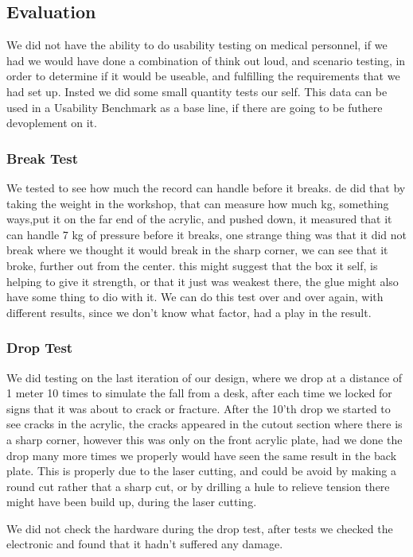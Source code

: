 \subsection{Evaluation}
We did not have the ability to do usability testing on medical personnel, if we had we would have done a combination of think out loud, and scenario testing, in order to determine if it would be useable, and fulfilling the requirements that we had set up.
Insted we did some small quantity tests our self.
This data can be used in a Usability Benchmark as a base line, if there are going to be futhere devoplement on it.

\subsubsection{Break Test}
We tested to see how much the record can handle before it breaks.
de did that by taking the weight in the workshop, that can measure how much kg, something ways,put it on the far end of the acrylic, and pushed down, it measured that it can handle 7 kg of pressure before it breaks, one strange thing was that it did not break where we thought it would break in the sharp corner, we can see that it broke, further out from the center.
this might suggest that the box it self, is helping to give it strength, or that it just was weakest there, the glue might also have some thing to dio with it.
We can do this test over and over again, with different results, since we don't know what factor, had a play in the result.

\subsubsection{Drop Test}
We did testing on the last iteration of our design, where we drop at a distance of 1 meter 10 times to simulate the fall from a desk, after each time we locked for signs that it was about to crack or fracture.
After the 10'th drop we started to see cracks in the acrylic, the cracks appeared in the cutout section where there is a sharp corner, however this was only on the front acrylic plate, had we done the drop many more times we properly would have seen the same result in the back plate.
This is properly due to the laser cutting, and could be avoid by making a round cut rather that a sharp cut, or by drilling a hule to relieve tension there might have been build up, during the laser cutting.

We did not check the hardware during the drop test, after tests we checked the electronic and found that it hadn't suffered any damage.

